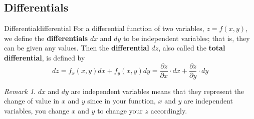 \documentclass[math,code]{amznotes}
\theoremstyle{remark}
\newtheorem*{remark}{Remark}
\begin{document}
\subsection{Differentials}
\begin{dfnbox}{Differential}{differential}
    For a differential function of two variables, $z=f(x,y)$, we define the {\color{red} \textbf{differentials}} $dx$ and $dy$ to be independent variables; that is, they can be given any values. Then the {\color{red} \textbf{differential}} $dz$, also called the {\color{red} \textbf{total differential}}, is defined by
    \begin{equation} \label{eq:two-varaibles-differentials}
        dz=f_x(x,y)dx+f_y(x,y)dy=\frac{\partial z}{\partial x}\cdot dx+\frac{\partial z}{\partial y}\cdot dy
    \end{equation}
\end{dfnbox}
\begin{notebox}
    \begin{remark}
        $dx$ and $dy$ are independent variables means that they represent the change of value in $x$ and $y$ since in your function, $x$ and $y$ are independent variables, you change $x$ and $y$ to change your $z$ accordingly.
    \end{remark}
\end{notebox}
\end{document}
